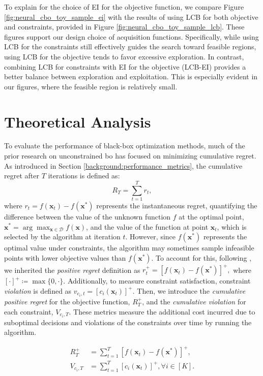 To explain for the choice of EI for the objective function, we compare Figure \ref{fig:neural_cbo_toy_sample_ei} with the results of using LCB for both objective and constraints, provided in Figure \ref{fig:neural_cbo_toy_sample_lcb}. These figures support our design choice of acquisition functions. Specifically, while using LCB for the constraints still effectively guides the search toward feasible regions, using LCB for the objective tends to favor excessive exploration. In contrast, combining LCB for constraints with EI for the objective (LCB-EI) provides a better balance between exploration and exploitation. This is especially evident in our figures, where the feasible region is relatively small.


\section{Theoretical Analysis}
To evaluate the performance of black-box optimization methods, much of the prior research on unconstrained \ac{bo} has focused on minimizing cumulative regret. As introduced in Section \ref{background:performance_metrics}, the cumulative regret after $T$ iterations is defined as:
\[
R_T = \sum_{t=1}^T r_t,  
\] 
where $r_t = f(\mathbf{x}_t) - f(\mathbf{x^*})$  represents the instantaneous regret, quantifying the difference between the value of the unknown function $f$ at the optimal point, $\mathbf{x}^* = \arg\max_{\mathbf{x} \in \mathcal{D}} f(\mathbf{x})$, and the value of the function at point $\mathbf{x}_t$, which is selected by the algorithm at iteration $t$. However, since $f(\mathbf{x^*})$ represents the optimal value under constraints, the algorithm may sometimes sample infeasible points with lower objective values than $f(\mathbf{x^*})$. To account for this, following \citet{xu2023constrained, nguyen2023optimistic}, we inherited the \textit{positive regret} definition as
$r_t^+ = [f(\mathbf{x}_t) - f(\mathbf{x^*})]^+,$
where $[\cdot]^+ \coloneqq \max\{0, \cdot\}$. Additionally, to measure constraint satisfaction, constraint \textit{violation} is defined as $
v_{c_i,t} = [c_i(\mathbf{x}_t)]^+$. 
Then, we introduce the \textit{cumulative positive regret} for the objective function, $R_T^+$, and the \textit{cumulative violation} for each constraint, $V_{c_i, T}$. These metrics measure the additional cost incurred due to suboptimal decisions and violations of the constraints over time by running the algorithm.  
\begin{definition} 
    \begin{align*}
        R_T^+ &=\sum_{t=1}^T [f(\mathbf{x}_t) - f(\mathbf{x^*})]^+,
        \\
        V_{c_i, T}  &= \sum_{t=1}^T [c_i(\mathbf{x}_t)]^+, \forall i \in [K].
    \end{align*}
        
\end{definition}
